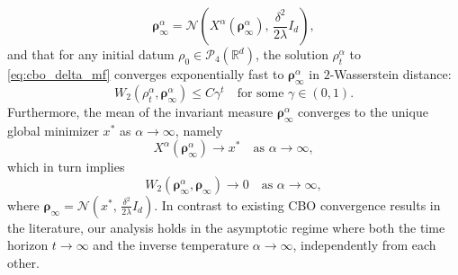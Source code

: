 \documentclass[reqno]{amsart}
\numberwithin{algorithm}{section}
\newcommand{\Xalpha}{{X^\alpha}}
\begin{document}
{{\begin{equation}
    \boldsymbol\rho_\infty^\alpha = \mathcal{N}\!\left(\Xalpha(\boldsymbol\rho_\infty^\alpha),\, \frac{\delta^2}{2\lambda} I_d\right),
\end{equation}
and that for any initial datum $\rho_0 \in \mathcal{P}_4(\mathbb{R}^d)$, the solution $\rho_t^\alpha$ to \eqref{eq:cbo_delta_mf} converges exponentially fast to $\boldsymbol\rho_\infty^\alpha$ in $2$-Wasserstein distance:
\begin{equation}
    W_2(\rho_t^\alpha, \boldsymbol\rho_\infty^\alpha) \leq C \gamma^t \quad \text{for some } \gamma \in (0,1).
\end{equation}
Furthermore, the mean of the invariant measure $\boldsymbol\rho_\infty^\alpha$ converges to the unique global minimizer $x^*$ as $\alpha \to \infty$, namely
\begin{equation}
    \Xalpha(\boldsymbol\rho_\infty^\alpha) \to x^* \quad \text{as } \alpha \to \infty,
\end{equation}
which in turn implies
\begin{equation}
    W_2(\boldsymbol\rho_\infty^\alpha, \boldsymbol{\rho}_\infty) \to 0 \quad \text{as } \alpha \to \infty,
\end{equation}
where $\boldsymbol{\rho}_\infty = \mathcal{N}\!\left(x^*,\, \frac{\delta^2}{2\lambda} I_d\right)$. In contrast to existing CBO convergence results in the literature, our analysis holds in the  asymptotic regime where both the time horizon $t \to \infty$ and the inverse temperature $\alpha \to \infty$, independently from each other.
}
\\

}
\end{document}
